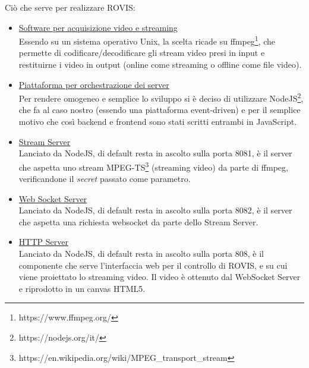 \documentclass[11pt]{article}
\begin{document}
Ciò che serve per realizzare ROVIS:
\begin{itemize}
	\item \underline{Software per acquisizione video e streaming}\\
	Essendo su un sistema operativo Unix, la scelta ricade su ffmpeg\footnote{https://www.ffmpeg.org/}, che permette di codificare/decodificare gli stream video presi in input e restituirne i video in output (online come streaming o offline come file video).
	\item \underline{Piattaforma per orchestrazione dei server}\\
	Per rendere omogeneo e semplice lo sviluppo si è deciso di utilizzare NodeJS\footnote{https://nodejs.org/it/}, che fa al caso nostro (essendo una piattaforma event-driven) e per il semplice motivo che così backend e frontend sono stati scritti entrambi in JavaScript. 
	\item \underline{Stream Server}\\
	Lanciato da NodeJS, di default resta in ascolto sulla porta 8081, è il server che aspetta uno stream MPEG-TS\footnote{https://en.wikipedia.org/wiki/MPEG\_transport\_stream} (streaming video) da parte di ffmpeg, verificandone il \textit{secret} passato come parametro.
	\item \underline{Web Socket Server}\\
		Lanciato da NodeJS, di default resta in ascolto sulla porta 8082, è il server che aspetta una richiesta websocket da parte dello Stream Server.
	\item \underline{HTTP Server}\\
		Lanciato da NodeJS, di default resta in ascolto sulla porta 808, è il componente che serve l'interfaccia web per il controllo di ROVIS, e su cui viene proiettato lo streaming video. Il video è ottenuto dal WebSocket Server e riprodotto in un canvas HTML5.
\end{itemize}
\end{document}

